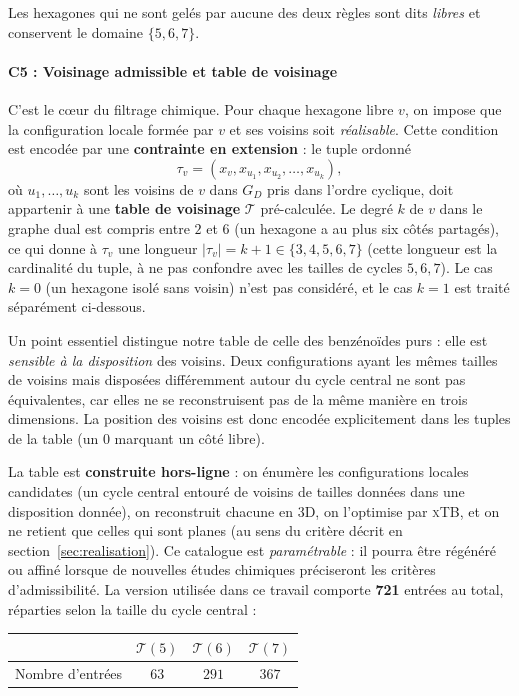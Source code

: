 \documentclass[11pt,a4paper]{article}
\newcommand{\GD}{\ensuremath{G_D}}                 %
\newcommand{\Tn}{\ensuremath{\mathcal{T}}}         %
\newcommand{\xtb}{\textsc{xTB}}
\begin{document}
Les hexagones qui ne sont gelés par aucune des deux règles sont dits
\emph{libres} et conservent le domaine $\{5, 6, 7\}$.

\paragraph*{C5 : Voisinage admissible et table de voisinage}
\label{sec:c5-table}

C'est le cœur du filtrage chimique. Pour chaque hexagone libre $v$, on impose
que la configuration locale formée par $v$ et ses voisins soit
\emph{réalisable}. Cette condition est encodée par une \textbf{contrainte
en extension} : le tuple ordonné
\[
  \tau_v = (x_v, x_{u_1}, x_{u_2}, \dots, x_{u_k}),
\]
où $u_1, \dots, u_k$ sont les voisins de $v$ dans \GD{} pris dans
l'ordre cyclique, doit appartenir à une \textbf{table de voisinage}
\Tn{} pré-calculée. Le degré $k$ de $v$ dans le graphe dual est
compris entre $2$ et $6$ (un hexagone a au plus six côtés partagés),
ce qui donne à $\tau_v$ une longueur $|\tau_v| = k + 1 \in
\{3, 4, 5, 6, 7\}$ (cette longueur est la cardinalité du tuple, à ne
pas confondre avec les tailles de cycles $5,6,7$). Le cas $k = 0$ (un
hexagone isolé sans voisin) n'est pas considéré, et le cas $k = 1$ est
traité séparément ci-dessous.

Un point essentiel distingue notre table de celle des benzénoïdes purs :
elle est \emph{sensible à la disposition} des voisins. Deux configurations
ayant les mêmes tailles de voisins mais disposées différemment autour du
cycle central ne sont pas équivalentes, car elles ne se reconstruisent pas
de la même manière en trois dimensions. La position des voisins est donc
encodée explicitement dans les tuples de la table (un $0$ marquant un côté
libre).

La table est \textbf{construite hors-ligne} : on énumère les configurations
locales candidates (un cycle central entouré de voisins de tailles données
dans une disposition donnée), on reconstruit chacune en 3D, on l'optimise
par \xtb{}, et on ne retient que celles qui sont planes (au sens du critère
décrit en section~\ref{sec:realisation}). Ce catalogue est
\emph{paramétrable} : il pourra être régénéré ou affiné lorsque de nouvelles
études chimiques préciseront les critères d'admissibilité. La version
utilisée dans ce travail comporte \textbf{721} entrées au total,
réparties selon la taille du cycle central :

\begin{center}
\small
\begin{tabular}{lccc}
\toprule
 & $\mathcal{T}(5)$ & $\mathcal{T}(6)$ & $\mathcal{T}(7)$ \\
\midrule
Nombre d'entrées & $63$ & $291$ & $367$ \\
\bottomrule
\end{tabular}
\end{center}
\end{document}
